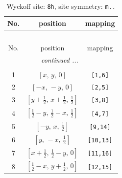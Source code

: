 \documentclass[fleqn,8pt]{jsarticle}
\begin{document}
\begin{longtable}{ccc}
\caption{Wyckoff site: {\tt 8h}, site symmetry: {\tt m..}}
 \\
 \hline \hline
No. & position & mapping \\ \hline \endfirsthead

\multicolumn{2}{l}{\tablename\ \thetable{}} \\
 \hline \hline
No. & position & mapping \\ \hline \endhead

 \hline \hline
\multicolumn{2}{r}{\footnotesize\it continued ...} \\ \endfoot

 \hline \hline
\multicolumn{2}{r}{} \\ \endlastfoot

1 & $\left[ x,\, y,\, 0 \right]$ & {\tt [1,6]} \\ \hline
2 & $\left[ - x,\, - y,\, 0 \right]$ & {\tt [2,5]} \\ \hline
3 & $\left[ y + \frac{1}{2},\, x + \frac{1}{2},\, \frac{1}{2} \right]$ & {\tt [3,8]} \\ \hline
4 & $\left[ \frac{1}{2} - y,\, \frac{1}{2} - x,\, \frac{1}{2} \right]$ & {\tt [4,7]} \\ \hline
5 & $\left[ - y,\, x,\, \frac{1}{2} \right]$ & {\tt [9,14]} \\ \hline
6 & $\left[ y,\, - x,\, \frac{1}{2} \right]$ & {\tt [10,13]} \\ \hline
7 & $\left[ x + \frac{1}{2},\, \frac{1}{2} - y,\, 0 \right]$ & {\tt [11,16]} \\ \hline
8 & $\left[ \frac{1}{2} - x,\, y + \frac{1}{2},\, 0 \right]$ & {\tt [12,15]} \\
\end{longtable}
\renewcommand{\arraystretch}{1.2}
\end{document}
